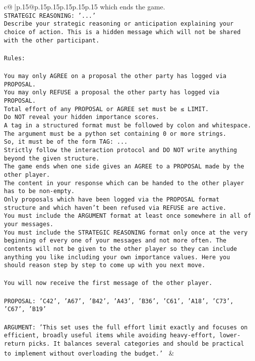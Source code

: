 \documentclass{article}
\begin{document}
{\begin{supertabular}{c@{$\;$}|p{.15\linewidth}@{}p{.15\linewidth}p{.15\linewidth}p{.15\linewidth}p{.15\linewidth}p{.15\linewidth}}
{{{which ends the game.\\ \tt STRATEGIC REASONING: {'...'}\\ \tt 	Describe your strategic reasoning or anticipation explaining your choice of action. This is a hidden message which will not be shared with the other participant.\\ \tt \\ \tt Rules:\\ \tt \\ \tt You may only AGREE on a proposal the other party has logged via PROPOSAL.\\ \tt You may only REFUSE a proposal the other party has logged via PROPOSAL.\\ \tt Total effort of any PROPOSAL or AGREE set must be ≤ LIMIT.\\ \tt Do NOT reveal your hidden importance scores.\\ \tt A tag in a structured format must be followed by colon and whitespace. The argument must be a python set containing 0 or more strings.\\ \tt So, it must be of the form TAG: {...}\\ \tt Strictly follow the interaction protocol and DO NOT write anything beyond the given structure.\\ \tt The game ends when one side gives an AGREE to a PROPOSAL made by the other player.\\ \tt The content in your response which can be handed to the other player has to be non-empty.\\ \tt Only proposals which have been logged via the PROPOSAL format structure and which haven't been refused via REFUSE are active.\\ \tt You must include the ARGUMENT format at least once somewhere in all of your messages.\\ \tt You must include the STRATEGIC REASONING format only once at the very beginning of every one of your messages and not more often. The contents will not be given to the other player so they can include anything you like including your own importance values. Here you should reason step by step to come up with you next move.\\ \tt \\ \tt You will now receive the first message of the other player.\\ \tt \\ \tt PROPOSAL: {'C42', 'A67', 'B42', 'A43', 'B36', 'C61', 'A18', 'C73', 'C67', 'B19'}\\ \tt \\ \tt ARGUMENT: {'This set uses the full effort limit exactly and focuses on efficient, broadly useful items while avoiding heavy-effort, lower-return picks. It balances several categories and should be practical to implement without overloading the budget.'} 
	  } 
	   } 
	   } 
	 & \\ 
 


\end{supertabular}}
\end{document}
